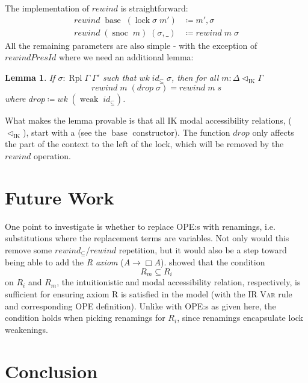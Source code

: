 \documentclass[12pt,twoside,openright]{report}
\numberwithin{equation}{chapter}
\numberwithin{figure}{chapter}
\numberwithin{table}{chapter}
\newtheorem{lemma}[theorem]{Lemma}
\theoremstyle{definition}\newtheorem{definition}{Definition}
\newcommand{\lock}{\text{\tikz[baseline]{
      \fill[rounded corners=.1ex] (-.75ex,0) rectangle (.75ex,1ex);
      \draw[line width=.3ex] (-.4ex,.5ex) -- ++(0,.75ex) arc (180:0:.4ex) -- ++(0,-.75ex);
}}}
\begin{document}
The implementation of $\textit{rewind}$ is straightforward:
\begin{equation*}
  \begin{split}
    \textit{rewind} \; \operatorname{base} \; (\operatorname{lock} \sigma \; m') &\coloneqq m' , \sigma \\
    \textit{rewind} \; (\operatorname{snoc} \; m) \; (\sigma , \_) &\coloneqq \textit{rewind} \; m \; \sigma
  \end{split}
\end{equation*}
All the remaining parameters are also simple -
with the exception of $\textit{rewindPresId}$ where we need an additional lemma:
\begin{lemma}
  If $\sigma : \operatorname{Rpl} \Gamma \; \Gamma'$ such that
  $\textit{wk} \; \textit{id}_\subseteq \; \sigma$,
  then for all $m : \Delta \lhd_\text{IK} \Gamma$
  $$ \textit{rewind} \; m \; (\textit{drop} \; \sigma) = \textit{rewind} \; m \; s $$
  where $\textit{drop} \coloneqq \textit{wk} \; (\operatorname{weak} \; \textit{id}_\subseteq)$.
\end{lemma}
What makes the lemma provable is that all IK modal accessibility relations,
($\lhd_\text{IK}$), start with a \lock (see the $\operatorname{base}$ constructor).
The function $\textit{drop}$ only affects
the part of the context to the left of the lock,
which will be removed by the $\textit{rewind}$ operation.

\chapter{Future Work}

One point to investigate is whether to replace OPE:s with renamings,
i.e. substitutions where the replacement terms are variables.
Not only would this remove
some $\textit{rewind}_\subseteq$/$\textit{rewind}$ repetition,
but it would also be a step toward being able to add the \emph{R axiom}
($A \to \Box A$).
\textcite{valliappan-r} showed that the condition
$$ R_m \subseteq R_i $$
on $R_i$ and $R_m$,
the intuitionistic and modal accessibility relation, respectively,
is sufficient for ensuring axiom R is satisfied in the model
(with the IR \textsc{Var} rule and corresponding OPE definition).
Unlike with OPE:s as given here,
the condition holds when picking renamings for $R_i$,
since renamings encapsulate lock weakenings.

\chapter{Conclusion}\label{sec:conclusion}

\cleardoublepage
\printbibliography[heading=bibintoc]
\end{document}
